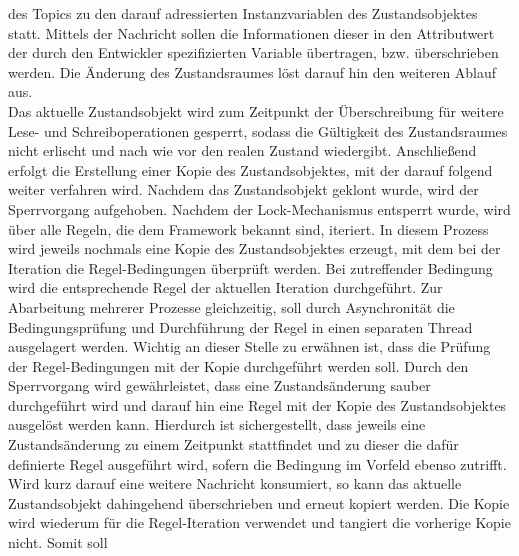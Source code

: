         des Topics zu den darauf adressierten Instanzvariablen des Zustandsobjektes statt. Mittels der Nachricht sollen die Informationen dieser 
        in den Attributwert der durch den Entwickler spezifizierten Variable übertragen, bzw. überschrieben werden. Die Änderung des 
        Zustandsraumes löst darauf hin den weiteren Ablauf aus. 
        \\
        Das aktuelle Zustandsobjekt wird zum Zeitpunkt der Überschreibung für weitere Lese- und Schreiboperationen gesperrt, sodass 
        die Gültigkeit des Zustandsraumes nicht erlischt und nach wie vor den realen Zustand wiedergibt. Anschließend erfolgt die 
        Erstellung einer Kopie des Zustandsobjektes, mit der 
        darauf folgend weiter verfahren wird. Nachdem das Zustandsobjekt geklont wurde, wird der Sperrvorgang aufgehoben. 
        Nachdem der Lock-Mechanismus entsperrt wurde, wird über alle Regeln, die dem Framework bekannt sind, iteriert. In diesem Prozess 
        wird jeweils nochmals eine Kopie des Zustandsobjektes erzeugt, mit dem bei der Iteration die Regel-Bedingungen überprüft werden. 
        Bei zutreffender Bedingung wird die entsprechende Regel der aktuellen Iteration durchgeführt. Zur Abarbeitung mehrerer Prozesse 
        gleichzeitig, soll durch Asynchronität die Bedingungsprüfung und Durchführung der Regel in einen separaten Thread ausgelagert werden. 
        Wichtig an dieser Stelle zu 
        erwähnen ist, dass die Prüfung der Regel-Bedingungen mit der Kopie durchgeführt werden soll.
        Durch den Sperrvorgang wird gewährleistet, dass eine Zustandsänderung sauber durchgeführt wird und darauf hin eine Regel mit der 
        Kopie des Zustandsobjektes ausgelöst werden kann. Hierdurch ist sichergestellt, dass jeweils eine Zustandsänderung zu einem 
        Zeitpunkt stattfindet und zu dieser die dafür definierte Regel ausgeführt wird, sofern die Bedingung im Vorfeld ebenso zutrifft. 
        \\
        Wird kurz darauf eine weitere Nachricht konsumiert, so kann das aktuelle Zustandsobjekt dahingehend überschrieben und erneut 
        kopiert werden. Die Kopie wird wiederum für die Regel-Iteration verwendet und tangiert die vorherige Kopie nicht. Somit soll 
